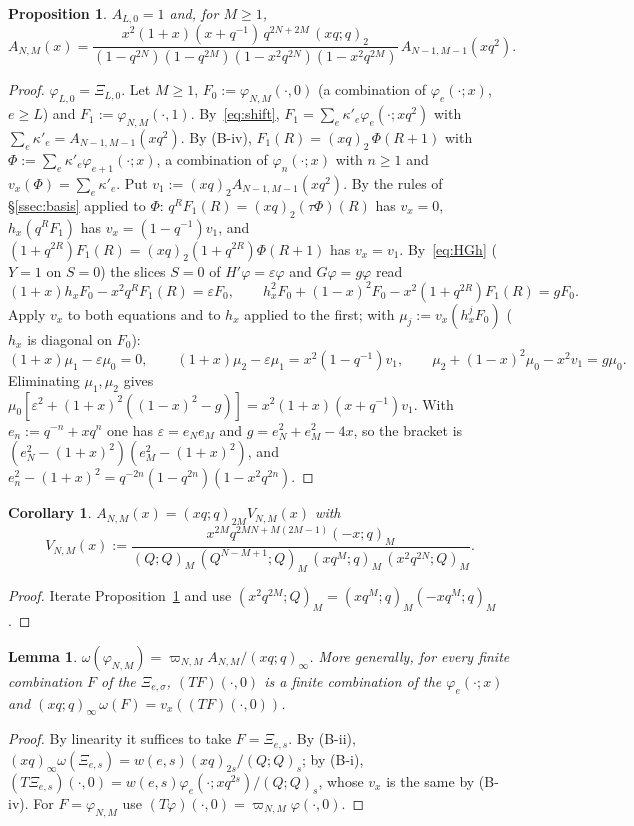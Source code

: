 \documentclass[11pt]{amsart}
\newtheorem{proposition}[theorem]{Proposition}
\newtheorem{lemma}[theorem]{Lemma}
\newtheorem{corollary}[theorem]{Corollary}
\theoremstyle{definition}
\numberwithin{equation}{section}
\begin{document}
\begin{proposition}\label{prop:Arec}
$A_{L,0}=1$ and, for $M\ge1$,
\[
A_{N,M}(x)=\frac{x^2(1+x)(x+q^{-1})\,q^{2N+2M}\,(xq;q)_2}{(1-q^{2N})(1-q^{2M})(1-x^2q^{2N})(1-x^2q^{2M})}\,A_{N-1,M-1}(xq^2).
\]
\end{proposition}
\begin{proof}
$\varphi_{L,0}=\Xi_{L,0}$. Let $M\ge1$, $F_0:=\varphi_{N,M}(\cdot,0)$ (a combination of $\varphi_e(\cdot;x)$, $e\ge L$)
and $F_1:=\varphi_{N,M}(\cdot,1)$. By~\eqref{eq:shift}, $F_1=\sum_e\kappa'_e\varphi_e(\cdot;xq^2)$ with
$\sum_e\kappa'_e=A_{N-1,M-1}(xq^2)$. By (B-iv), $F_1(R)=(xq)_2\,\Phi(R+1)$ with $\Phi:=\sum_e\kappa'_e\varphi_{e+1}(\cdot;x)$, a
combination of $\varphi_n(\cdot;x)$ with $n\ge1$ and $v_x(\Phi)=\sum_e\kappa'_e$. Put $v_1:=(xq)_2A_{N-1,M-1}(xq^2)$. By the
rules of §\ref{ssec:basis} applied to $\Phi$: $q^RF_1(R)=(xq)_2(\tau\Phi)(R)$ has $v_x=0$, $h_x(q^RF_1)$ has
$v_x=(1-q^{-1})v_1$, and $(1+q^{2R})F_1(R)=(xq)_2(1+q^{2R})\Phi(R+1)$ has $v_x=v_1$. By~\eqref{eq:HGh} ($Y=1$ on $S=0$)
the slices $S=0$ of $H'\varphi=\varepsilon\varphi$ and $G\varphi=g\varphi$ read
\[
(1+x)h_xF_0-x^2q^RF_1(R)=\varepsilon F_0,\qquad h_x^2F_0+(1-x)^2F_0-x^2(1+q^{2R})F_1(R)=gF_0 .
\]
Apply $v_x$ to both equations and to $h_x$ applied to the first; with $\mu_j:=v_x(h_x^jF_0)$ ($h_x$ is diagonal on $F_0$):
\[
(1+x)\mu_1-\varepsilon\mu_0=0,\qquad (1+x)\mu_2-\varepsilon\mu_1=x^2(1-q^{-1})v_1,\qquad \mu_2+(1-x)^2\mu_0-x^2v_1=g\mu_0 .
\]
Eliminating $\mu_1,\mu_2$ gives $\mu_0[\varepsilon^2+(1+x)^2((1-x)^2-g)]=x^2(1+x)(x+q^{-1})v_1$. With $e_n:=q^{-n}+xq^n$ one has
$\varepsilon=e_Ne_M$ and $g=e_N^2+e_M^2-4x$, so the bracket is $(e_N^2-(1+x)^2)(e_M^2-(1+x)^2)$, and
$e_n^2-(1+x)^2=q^{-2n}(1-q^{2n})(1-x^2q^{2n})$.
\end{proof}

\begin{corollary}\label{cor:V}
$A_{N,M}(x)=(xq;q)_{2M}V_{N,M}(x)$ with
\[
V_{N,M}(x):=\frac{x^{2M}q^{2MN+M(2M-1)}(-x;q)_M}{(Q;Q)_M\,(Q^{N-M+1};Q)_M\,(xq^M;q)_M\,(x^2q^{2N};Q)_M}.
\]
\end{corollary}
\begin{proof}
Iterate Proposition~\ref{prop:Arec} and use $(x^2q^{2M};Q)_M=(xq^M;q)_M(-xq^M;q)_M$.
\end{proof}

\begin{lemma}\label{lem:omphi}
$\omega(\varphi_{N,M})=\varpi_{N,M}A_{N,M}/(xq;q)_\infty$. More generally, for every finite combination $F$ of the
$\Xi_{e,\sigma}$, $(TF)(\cdot,0)$ is a finite combination of the $\varphi_e(\cdot;x)$ and $(xq;q)_\infty\,\omega(F)=v_x((TF)(\cdot,0))$.
\end{lemma}
\begin{proof}
By linearity it suffices to take $F=\Xi_{e,s}$. By (B-ii), $(xq)_\infty\omega(\Xi_{e,s})=w(e,s)(xq)_{2s}/(Q;Q)_s$; by (B-i),
$(T\Xi_{e,s})(\cdot,0)=w(e,s)\varphi_e(\cdot;xq^{2s})/(Q;Q)_s$, whose $v_x$ is the same by (B-iv). For $F=\varphi_{N,M}$ use
$(T\varphi)(\cdot,0)=\varpi_{N,M}\varphi(\cdot,0)$.
\end{proof}
\end{document}
